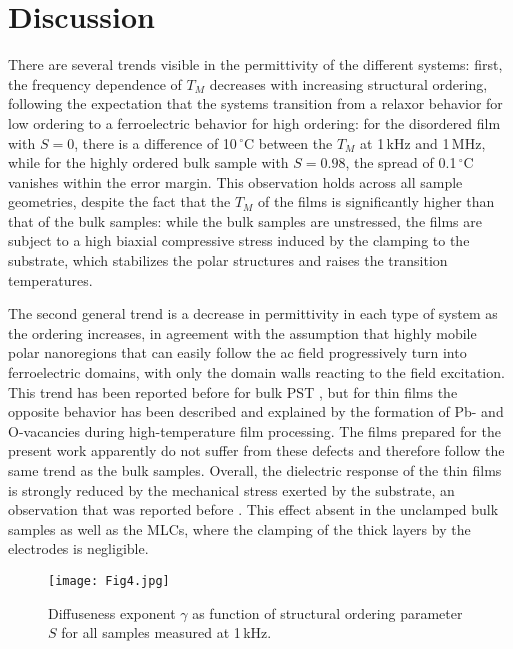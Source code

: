 \documentclass[%
 preprint, %
 amsmath,amssymb,
 aps, physrev,
]{revtex4-2}
\begin{document}
\section{Discussion}

There are several trends visible in the permittivity of the different systems: first, the frequency dependence of $T_M$ decreases with increasing structural ordering, following the expectation that the systems transition from a relaxor behavior for low ordering to a ferroelectric behavior for high ordering: for the disordered film with $S=0$, there is a difference of 10\,$^{ \circ}$C between the $T_M$ at 1\,kHz and 1\,MHz, while for the highly ordered bulk sample with $S=0.98$, the spread of 0.1\,$^{ \circ}$C vanishes within the error margin. This observation holds across all sample geometries, despite the fact that the $T_M$ of the films is significantly higher than that of the bulk samples: while the bulk samples are unstressed, the films are subject to a high biaxial compressive stress induced by the clamping to the substrate, which stabilizes the polar structures and raises the transition temperatures.

The second general trend is a decrease in permittivity in each type of system as the ordering increases, in agreement with the assumption that highly mobile polar nanoregions that can easily follow the ac field progressively turn into ferroelectric domains, with only the domain walls reacting to the field excitation. This trend has been reported before for bulk PST \cite{Stenger79, Setter80}, but for thin films the opposite behavior has been described \cite{Brinkmann07} and explained by the formation of Pb- and O-vacancies during high-temperature film processing. The films prepared for the present work apparently do not suffer from these defects and therefore follow the same trend as the bulk samples. Overall, the dielectric response of the thin films is strongly reduced by the mechanical stress exerted by the substrate, an observation that was reported before \cite{Brinkmann07b}. This effect absent in the unclamped bulk samples as well as the MLCs, where the clamping of the thick layers by the electrodes is negligible.

\begin{figure}[htbp]
\texttt{[image: Fig4.jpg]}
\caption{\label{f4} Diffuseness exponent $\gamma$ as function of structural ordering parameter $S$ for all samples measured at 1\,kHz.}
\end{figure}
\end{document}
